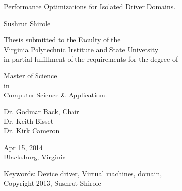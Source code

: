 \documentclass[12pt]{report}
\begin{document}
\thispagestyle{empty}
\begin{center}

{\Large 
Performance Optimizations for Isolated Driver Domains.
}

\vfill

Sushrut Shirole

\vfill

Thesis submitted to the Faculty of the \\
Virginia Polytechnic Institute and State University \\
in partial fulfillment of the requirements for the degree of

\vfill

Master of Science \\
in \\
Computer Science \& Applications

\vfill

Dr. Godmar Back, Chair \\
Dr. Keith Bisset \\
Dr. Kirk Cameron\\


\vfill

Apr 15, 2014 \\
Blacksburg, Virginia

\vfill

Keywords: Device driver, Virtual machines, domain,  
\\
Copyright 2013, Sushrut Shirole

\end{center}

\pagebreak
\end{document}
